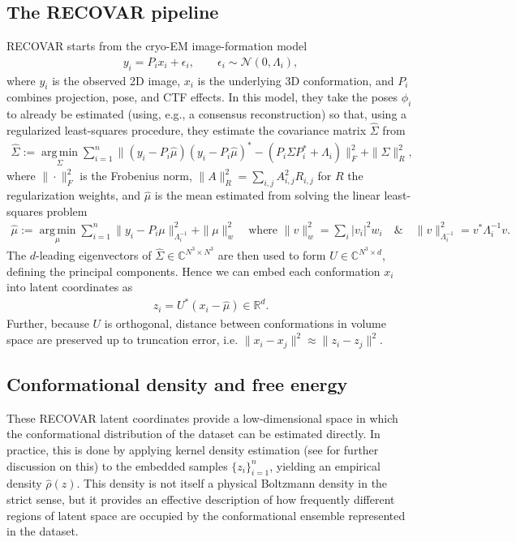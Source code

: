 \documentclass[11pt]{amsart}
\newcommand{\CC}{\mathbb{C}}
\newcommand{\RR}{\mathbb{R}}
\begin{document}
\subsection{The RECOVAR pipeline}
RECOVAR starts from the cryo-EM image-formation model
\begin{align}
    y_i = P_i x_i + \epsilon_i, \qquad \epsilon_i \sim \mathcal{N}(0,\Lambda_i),
\end{align}
where $y_i$ is the observed 2D image, $x_i$ is the underlying 3D conformation, and $P_i$ combines projection, pose, and CTF effects. In this model, they take the poses $\phi_i$ to already be estimated (using, e.g., a consensus reconstruction) so that, using a regularized least-squares procedure, they estimate the covariance matrix $\hat{\Sigma}$ from
\begin{align}
    \hat{\Sigma}:=\operatorname*{arg\,min}_\Sigma\sum_{i=1}^n\|(y_i-P_i\hat{\mu})(y_i-P_i\hat{\mu})^*-(P_i\Sigma P_i^*+\Lambda_i)\|^2_F+\|\Sigma\|^2_R,
\end{align}
where $\|\cdot\|^2_F$ is the Frobenius norm, $\|A\|^2_R=\sum_{i,j}A^2_{i,j}R_{i,j}$ for $R$ the regularization weights, and $\hat{\mu}$ is the mean estimated from solving the linear least-squares problem
\begin{align}
    \hat{\mu}:=\operatorname*{arg\,min}_\mu\sum_{i=1}^n\|y_i-P_i\mu\|^2_{\Lambda_i^{-1}}+\|\mu\|^2_w\quad\text{where } \|v\|^2_w=\sum_i|v_i|^2w_i\quad \&\quad\|v\|^2_{\Lambda_i^{-1}}=v^*\Lambda_i^{-1}v.
\end{align}
The $d$-leading eigenvectors of $\hat{\Sigma}\in\CC^{N^3\times N^3}$ are then used to form $U\in\CC^{N^3\times d}$, defining the principal components. Hence we can embed each conformation $x_i$ into latent coordinates as
\begin{align}
    z_i=U^*(x_i-\hat{\mu})\in\RR^d.
\end{align}
Further, because $U$ is orthogonal, distance between conformations in volume space are preserved up to truncation error, i.e. $\|x_i-x_j\|^2\approx\|z_i-z_j\|^2$.

\subsection{Conformational density and free energy}\label{subsec:rec-con-dens}
These RECOVAR latent coordinates provide a low-dimensional space in which the conformational distribution of the dataset can be estimated directly. In practice, this is done by applying kernel density estimation (see  for further discussion on this) to the embedded samples $\{z_i\}_{i=1}^n$, yielding an empirical density $\hat{\rho}(z)$. This density is not itself a physical Boltzmann density in the strict sense, but it provides an effective description of how frequently different regions of latent space are occupied by the conformational ensemble represented in the dataset.
\end{document}
